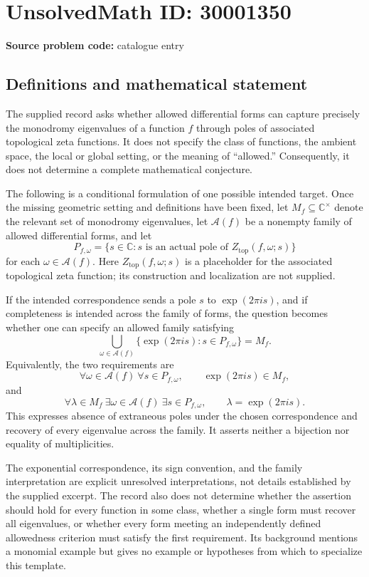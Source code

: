 \documentclass[11pt]{article}
\newcommand{\C}{\mathbb{C}}
\begin{document}
\section*{UnsolvedMath ID: 30001350}
\textbf{Source problem code:} catalogue entry
\subsection{Definitions and mathematical statement}
The supplied record asks whether allowed differential forms can capture precisely the monodromy eigenvalues of a function \(f\) through poles of associated topological zeta functions. It does not specify the class of functions, the ambient space, the local or global setting, or the meaning of ``allowed.'' Consequently, it does not determine a complete mathematical conjecture.

The following is a conditional formulation of one possible intended target. Once the missing geometric setting and definitions have been fixed, let \(M_f\subseteq\C^\times\) denote the relevant set of monodromy eigenvalues, let \(\mathcal A(f)\) be a nonempty family of allowed differential forms, and let
\[
 P_{f,\omega}=\{s\in\C:s\text{ is an actual pole of }Z_{\mathrm{top}}(f,\omega;s)\}
\]
for each \(\omega\in\mathcal A(f)\). Here \(Z_{\mathrm{top}}(f,\omega;s)\) is a placeholder for the associated topological zeta function; its construction and localization are not supplied.

If the intended correspondence sends a pole \(s\) to \(\exp(2\pi i s)\), and if completeness is intended across the family of forms, the question becomes whether one can specify an allowed family satisfying
\[
 \bigcup_{\omega\in\mathcal A(f)}
 \{\exp(2\pi i s):s\in P_{f,\omega}\}=M_f.
\]
Equivalently, the two requirements are
\[
 \forall\omega\in\mathcal A(f)\ \forall s\in P_{f,\omega},\qquad
 \exp(2\pi i s)\in M_f,
\]
and
\[
 \forall\lambda\in M_f\ \exists\omega\in\mathcal A(f)\ \exists s\in P_{f,\omega},\qquad
 \lambda=\exp(2\pi i s).
\]
This expresses absence of extraneous poles under the chosen correspondence and recovery of every eigenvalue across the family. It asserts neither a bijection nor equality of multiplicities.

The exponential correspondence, its sign convention, and the family interpretation are explicit unresolved interpretations, not details established by the supplied excerpt. The record also does not determine whether the assertion should hold for every function in some class, whether a single form must recover all eigenvalues, or whether every form meeting an independently defined allowedness criterion must satisfy the first requirement. Its background mentions a monomial example but gives no example or hypotheses from which to specialize this template.
\end{document}
